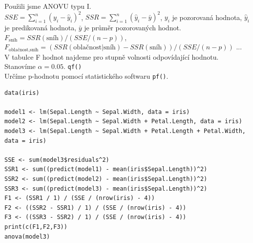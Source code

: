 \documentclass[
	11pt, %
]{beamer}
\begin{document}
\begin{frame}
	Použili jsme ANOVU typu I. \\
	$SSE = \sum_{i=1}^n(y_i-\hat{y}_i)^2$, $SSR = \sum_{i=1}^n(\hat{y}_i-\bar{y})^2$, $y_i$ je pozorovaná hodnota, $\hat{y}_i$ je predikovaná hodnota, $\bar{y}$ je průměr pozorovaných hodnot.\\


	$F_{\text{sníh}} = SSR(\text{sníh})/(SSE/(n-p))$, \\
	$F_{\text{oblačnost,sníh}} = (SSR(\text{oblačnost}|\text{sníh})-SSR(\text{sníh}))/(SSE/(n-p))$ ...\\
	V tabulce F hodnot najdeme pro stupně volnosti odpovídající hodnotu. Stanovíme $\alpha = 0.05$. \texttt{qf()}\\
	Určíme p-hodnotu pomocí statistického softwaru \texttt{pf()}.
\end{frame}

\begin{frame}[fragile]
\begin{lstlisting}[basicstyle=\tiny]
data(iris)

model1 <- lm(Sepal.Length ~ Sepal.Width, data = iris)
model2 <- lm(Sepal.Length ~ Sepal.Width + Petal.Length, data = iris)
model3 <- lm(Sepal.Length ~ Sepal.Width + Petal.Length + Petal.Width, data = iris)

SSE <- sum(model3$residuals^2)
SSR1 <- sum((predict(model1) - mean(iris$Sepal.Length))^2)
SSR2 <- sum((predict(model2) - mean(iris$Sepal.Length))^2)
SSR3 <- sum((predict(model3) - mean(iris$Sepal.Length))^2)
F1 <- (SSR1 / 1) / (SSE / (nrow(iris) - 4))
F2 <- ((SSR2 - SSR1) / 1) / (SSE / (nrow(iris) - 4))
F3 <- ((SSR3 - SSR2) / 1) / (SSE / (nrow(iris) - 4))
print(c(F1,F2,F3))
anova(model3)
\end{lstlisting}
\end{frame}
\end{document}
